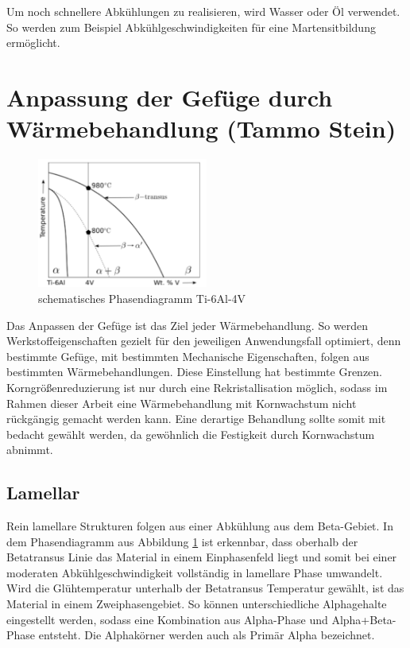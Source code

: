 \documentclass[a4paper, 11pt]{tubsreprt}
\begin{document}
Um noch schnellere Abkühlungen zu realisieren, wird Wasser oder Öl verwendet. So werden zum Beispiel Abkühlgeschwindigkeiten für eine Martensitbildung ermöglicht.


\section{Anpassung der Gefüge durch Wärmebehandlung (Tammo Stein)}
\begin{figure}
	\centering
	\includegraphics[width=0.5\textwidth]{Bilder/Phasendiagram.PNG}
	\caption[Phasendiagramm]{schematisches Phasendiagramm Ti-6Al-4V \cite{Babu2008}}
	\label{Phasendiagram}
\end{figure}

Das Anpassen der Gefüge ist das Ziel jeder Wärmebehandlung. So werden Werkstoffeigenschaften gezielt für den jeweiligen Anwendungsfall optimiert, denn bestimmte Gefüge, mit bestimmten Mechanische Eigenschaften, folgen aus bestimmten Wärmebehandlungen. Diese Einstellung hat bestimmte Grenzen. Korngrößenreduzierung ist nur durch eine Rekristallisation möglich, sodass im Rahmen dieser Arbeit eine Wärmebehandlung mit Kornwachstum nicht rückgängig gemacht werden kann. Eine derartige Behandlung sollte somit mit bedacht gewählt werden, da gewöhnlich die Festigkeit durch Kornwachstum abnimmt.
\subsection{Lamellar}
Rein lamellare Strukturen folgen aus einer Abkühlung aus dem Beta-Gebiet. In dem Phasendiagramm aus Abbildung \ref{Phasendiagram} ist erkennbar, dass oberhalb der Betatransus Linie das Material in einem Einphasenfeld liegt und somit bei einer moderaten Abkühlgeschwindigkeit vollständig in lamellare Phase umwandelt. Wird die Glühtemperatur unterhalb der Betatransus Temperatur gewählt, ist das Material in einem Zweiphasengebiet. So können unterschiedliche Alphagehalte eingestellt werden, sodass eine Kombination aus Alpha-Phase und Alpha+Beta-Phase entsteht. Die Alphakörner werden auch als Primär Alpha bezeichnet.
\end{document}
